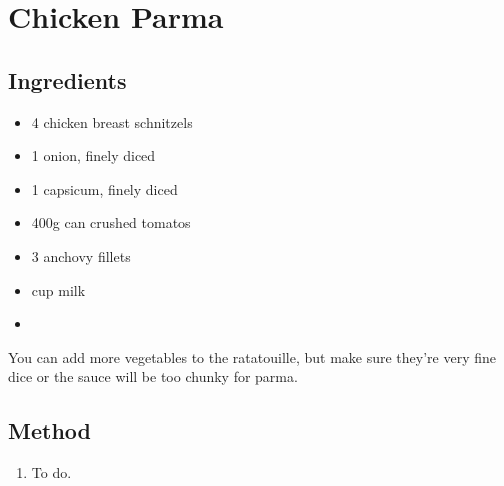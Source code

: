 \section{Chicken Parma}

  
  \subsection{Ingredients}
    
  \begin{itemize}
    \item 4 chicken breast schnitzels
    \item 1 onion, finely diced
    \item 1 capsicum, finely diced
    \item 400g can crushed tomatos
    \item 3 anchovy fillets
    \item {} cup milk
    \item 
  \end{itemize}

  You can add more vegetables to the ratatouille, but make sure they're very fine dice or the sauce will be too chunky for parma.

  \subsection{Method}

  \begin{enumerate}
    \item To do.
  \end{enumerate}
